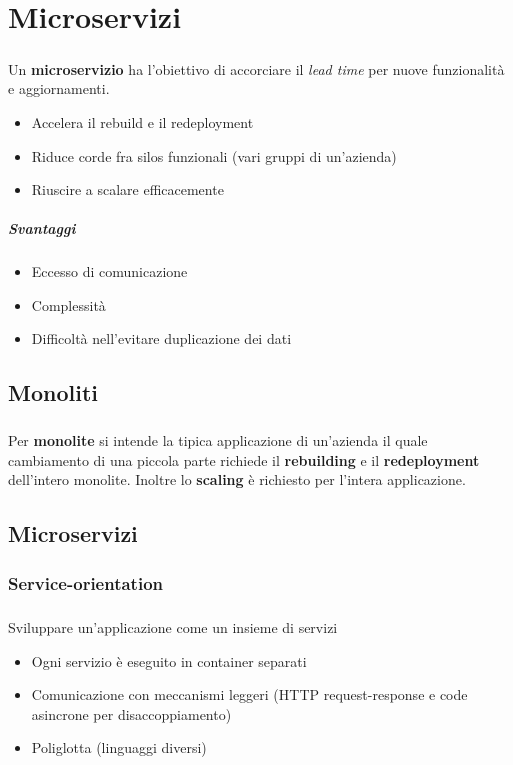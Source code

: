 \documentclass[a4paper, 12pt]{report}
\begin{document}
      \chapter{Microservizi}
          \paragraph{}Un \textbf{microservizio} ha l'obiettivo di accorciare il \textit{lead time} per nuove funzionalità e aggiornamenti. 
          \begin{itemize}
            \item Accelera il rebuild e il redeployment
            \item Riduce corde fra silos funzionali (vari gruppi di un'azienda)
            \item Riuscire a scalare efficacemente
          \end{itemize}
          \paragraph{Svantaggi}
          \begin{itemize}
            \item Eccesso di comunicazione
            \item Complessità
            \item Difficoltà nell'evitare duplicazione dei dati 
          \end{itemize}
          \section{Monoliti}
          \paragraph{}Per \textbf{monolite} si intende la tipica applicazione di un'azienda il quale cambiamento di una piccola parte richiede
          il \textbf{rebuilding} e il \textbf{redeployment} dell'intero monolite. Inoltre lo \textbf{scaling} è richiesto per l'intera applicazione.
          \section{Microservizi}
          \subsection{Service-orientation}
            \paragraph{}Sviluppare un'applicazione come un insieme di servizi
            \begin{itemize}
              \item Ogni servizio è eseguito in container separati
              \item Comunicazione con meccanismi leggeri (HTTP request-response e code asincrone per disaccoppiamento)
              \item Poliglotta (linguaggi diversi)
            \end{itemize}
\end{document}
